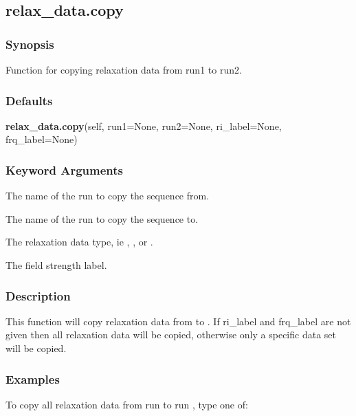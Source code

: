 \subsection{relax\_data.copy}


\subsubsection{Synopsis}

Function for copying relaxation data from run1 to run2.

\subsubsection{Defaults}

\textsf{\textbf{relax\_data.copy}(self, run1=None, run2=None, ri\_label=None, frq\_label=None)}


\subsubsection{Keyword Arguments}


  The name of the run to copy the sequence from.

  The name of the run to copy the sequence to.

  The relaxation data type, ie 
, 
, or 
.

  The field strength label.

\subsubsection{Description}

This function will copy relaxation data from 
 to 
.  If ri\_label and frq\_label
are not given then all relaxation data will be copied, otherwise only a specific data set
will be copied.


\subsubsection{Examples}

To copy all relaxation data from run 
 to run 
, type one of:



